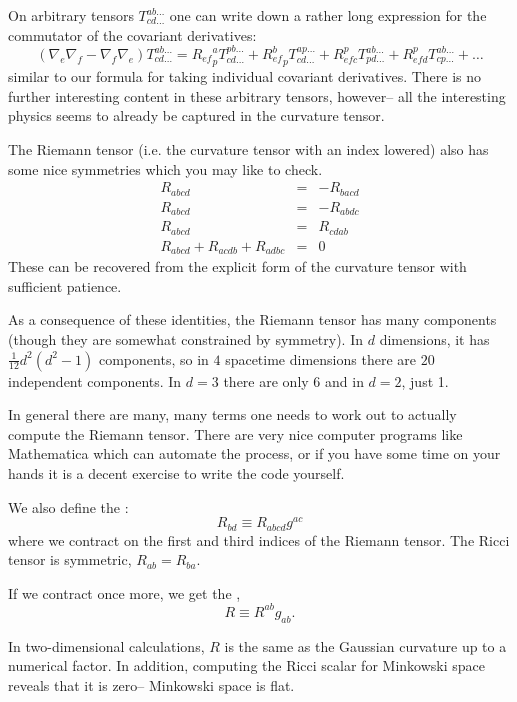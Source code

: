 On arbitrary tensors $T^{ab\ldots}_{cd\ldots}$ one can write down a rather long expression for the commutator of the covariant derivatives:
$$(\nabla_e \nabla_f -\nabla_f \nabla_e)T^{ab\ldots}_{cd\ldots} = {R_{ef}}^a_p T^{pb \ldots}_{cd \ldots}+{R_{ef}^b}_p T^{ap\ldots}_{cd \ldots}+ R_{efc}^p T^{ab\ldots}_{pd\ldots} + R_{efd}^p T^{ab\ldots}_{cp\ldots} + \ldots$$
similar to our formula for taking individual covariant derivatives. There is no further interesting content in these arbitrary tensors, however-- all the interesting physics seems to already be captured in the curvature tensor.

The Riemann tensor (i.e. the curvature tensor with an index lowered) also has some nice symmetries which you may like to check.
\begin{eqnarray*}
R_{abcd}&=& -R_{bacd}\\
R_{abcd}&=& -R_{abdc}\\
R_{abcd}&=&R_{cdab}\\
R_{abcd}+R_{acdb}+R_{adbc}&=&0
\end{eqnarray*}
These can be recovered from the explicit form of the curvature tensor with sufficient patience.

As a consequence of these identities, the Riemann tensor has many components (though they are somewhat constrained by symmetry). In $d$ dimensions, it has
$\frac{1}{12} d^2(d^2-1)$ components, so in $4$ spacetime dimensions there are $20$ independent components. In $d=3$ there are only $6$ and in $d=2$, just 1.

In general there are many, many terms one needs to work out to actually compute the Riemann tensor. There are very nice computer programs like Mathematica which can automate the process, or if you have some time on your hands it is a decent exercise to write the code yourself.

\begin{defn}
We also define the :
$$R_{bd}\equiv R_{abcd}g^{ac}$$
where we contract on the first and third indices of the Riemann tensor. The Ricci tensor is symmetric, $R_{ab}=R_{ba}$.
\end{defn}
\begin{defn}
If we contract once more, we get the ,
$$R\equiv R^{ab}g_{ab}.$$
\end{defn}

In two-dimensional calculations, $R$ is the same as the Gaussian curvature up to a numerical factor. 
In addition, computing the Ricci scalar for Minkowski space reveals that it is zero-- Minkowski space is flat.

